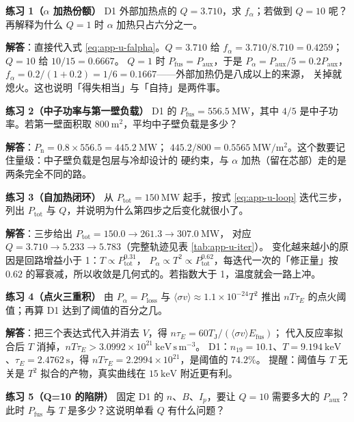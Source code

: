 \textbf{练习 1（$\alpha$ 加热份额）}
D1 外部加热点的 $Q=3.710$，求 $f_\alpha$；若做到 $Q=10$ 呢？再解释为什么 $Q=1$ 时
$\alpha$ 加热只占六分之一。

\textbf{解答}：直接代入式 \eqref{eq:app-u-falpha}。$Q=3.710$ 给
$f_\alpha = 3.710/8.710 = 0.4259$；$Q=10$ 给 $10/15 = 0.6667$。
$Q=1$ 时 $P_{\mathrm{fus}} = P_{\mathrm{aux}}$，于是
$P_\alpha = P_{\mathrm{aux}}/5 = 0.2P_{\mathrm{aux}}$，
$f_\alpha = 0.2/(1+0.2) = 1/6 = 0.1667$——外部加热仍是八成以上的来源，
关掉就熄火。这也说明「得失相当」与「自持」是两件事。

\textbf{练习 2（中子功率与第一壁负载）}
D1 的 $P_{\mathrm{fus}} = 556.5\ \mathrm{MW}$，其中 $4/5$ 是中子功率。若第一壁面积取
$800\ \mathrm{m^2}$，平均中子壁负载是多少？

\textbf{解答}：$P_{\mathrm{n}} = 0.8\times556.5 = 445.2\ \mathrm{MW}$；
$445.2/800 = 0.5565\ \mathrm{MW/m^2}$。这个数要记住量级：中子壁负载是包层与冷却设计的
硬约束，与 $\alpha$ 加热（留在芯部）走的是两条完全不同的路。

\textbf{练习 3（自加热闭环）}
从 $P_{\mathrm{tot}} = 150\ \mathrm{MW}$ 起手，按式 \eqref{eq:app-u-loop} 迭代三步，
列出 $P_{\mathrm{tot}}$ 与 $Q$，并说明为什么第四步之后变化就很小了。

\textbf{解答}：三步给出 $P_{\mathrm{tot}} = 150.0 \to 261.3 \to 307.0\ \mathrm{MW}$，
对应 $Q = 3.710 \to 5.233 \to 5.783$（完整轨迹见表 \ref{tab:app-u-iter}）。
变化越来越小的原因是回路增益小于 1：$T\propto P_{\mathrm{tot}}^{0.31}$，
$P_\alpha\propto T^2\propto P_{\mathrm{tot}}^{0.62}$，每迭代一次的「修正量」按
$0.62$ 的幂衰减，所以收敛是几何式的。若指数大于 1，温度就会一路上冲。

\textbf{练习 4（点火三重积）}
由 $P_\alpha = P_{\mathrm{loss}}$ 与 $\langle\sigma v\rangle \approx 1.1\times10^{-24}T^2$
推出 $nT\tau_E$ 的点火阈值；再算 D1 达到了阈值的百分之几。

\textbf{解答}：把三个表达式代入并消去 $V$，得
$n\tau_E = 60T_{\mathrm J}/(\langle\sigma v\rangle E_{\mathrm{fus}})$；
代入反应率拟合后 $T$ 消掉，$nT\tau_E > 3.0992\times10^{21}\ \mathrm{keV\,s\,m^{-3}}$。
D1：$n_{19}=10.1$、$T=9.194\ \mathrm{keV}$、$\tau_E=2.4762\ \mathrm{s}$，得
$nT\tau_E = 2.2994\times10^{21}$，是阈值的 $74.2\%$。
提醒：阈值与 $T$ 无关是 $T^2$ 拟合的产物，真实曲线在 $15\ \mathrm{keV}$ 附近更有利。

\textbf{练习 5（Q=10 的陷阱）}
固定 D1 的 $n$、$B$、$I_p$，要让 $Q=10$ 需要多大的 $P_{\mathrm{aux}}$？此时
$P_{\mathrm{fus}}$ 与 $T$ 是多少？这说明单看 $Q$ 有什么问题？


